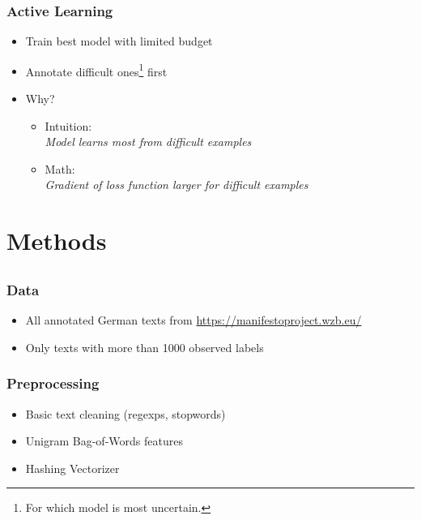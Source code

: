 \documentclass[]{beamer}
\begin{document}
\begin{frame}\frametitle{Active Learning}
\begin{itemize}[<+->]
\item Train best model with limited budget
\item Annotate difficult ones\footnote{For which model is most uncertain.} first
\item Why?
\begin{itemize}
\item Intuition: \\
\textit{ Model learns most from difficult examples}\\
\item Math:\\
\textit{ Gradient of loss function larger for difficult examples }\\
\end{itemize}
\end{itemize}
\end{frame}

\section{Methods}
\subsection{}

\begin{frame}\frametitle{Data}
\begin{itemize}
\item All annotated German texts from \url{https://manifestoproject.wzb.eu/} 
\item Only texts with more than 1000 observed labels
\end{itemize}
\end{frame}

\begin{frame}\frametitle{Preprocessing}
\begin{itemize}
\item Basic text cleaning (regexps, stopwords)
\item Unigram Bag-of-Words features
\item Hashing Vectorizer
\end{itemize}
\end{frame}
\end{document}
